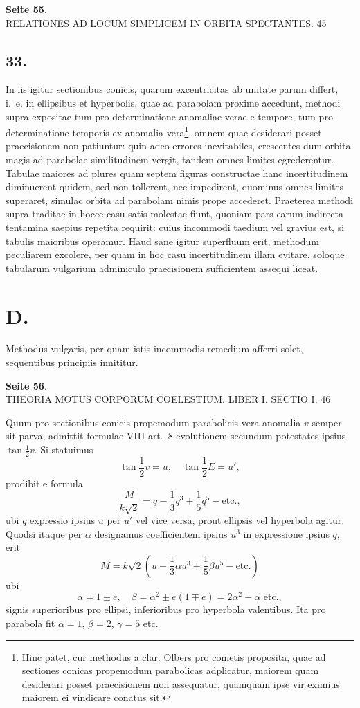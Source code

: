 \documentclass[12pt,a4paper]{article}
\begin{document}
\textbf{Seite 55}.\\
RELATIONES AD LOCUM SIMPLICEM IN ORBITA SPECTANTES. 45

\subsection*{33.}

In iis igitur sectionibus conicis, quarum excentricitas ab unitate parum differt, i.~e. in ellipsibus et hyperbolis, quae ad parabolam proxime accedunt, methodi supra expositae tum pro determinatione anomaliae verae e tempore, tum pro determinatione temporis ex anomalia vera\footnote{Hinc patet, cur methodus a clar. Olbers pro cometis proposita, quae ad sectiones conicas propemodum parabolicas adplicatur, maiorem quam desiderari posset praecisionem non assequatur, quamquam ipse vir eximius maiorem ei vindicare conatus sit.}, omnem quae desiderari posset praecisionem non patiuntur: quin adeo errores inevitabiles, crescentes dum orbita magis ad parabolae similitudinem vergit, tandem omnes limites egrederentur. Tabulae maiores ad plures quam septem figuras constructae hanc incertitudinem diminuerent quidem, sed non tollerent, nec impedirent, quominus omnes limites superaret, simulac orbita ad parabolam nimis prope accederet. Praeterea methodi supra traditae in hocce casu satis molestae fiunt, quoniam pars earum indirecta tentamina saepius repetita requirit: cuius incommodi taedium vel gravius est, si tabulis maioribus operamur. Haud sane igitur superfluum erit, methodum peculiarem excolere, per quam in hoc casu incertitudinem illam evitare, soloque tabularum vulgarium adminiculo praecisionem sufficientem assequi liceat.

\section*{D.}

Methodus vulgaris, per quam istis incommodis remedium afferri solet, sequentibus principiis innititur.

\textbf{Seite 56}.\\
THEORIA MOTUS CORPORUM COELESTIUM. LIBER I. SECTIO I. 46

Quum pro sectionibus conicis propemodum parabolicis vera anomalia $v$ semper sit parva, admittit formulae VIII art.~8 evolutionem secundum potestates ipsius $\tan \frac{1}{2}v$. Si statuimus
\[
\tan \frac{1}{2}v = u, \quad \tan \frac{1}{2}E = u',
\]
prodibit e formula
\[
\frac{M}{k \sqrt{2}} = q - \frac{1}{3}q^3 + \frac{1}{5}q^5 - \text{etc.},
\]
ubi $q$ expressio ipsius $u$ per $u'$ vel vice versa, prout ellipsis vel hyperbola agitur. Quodsi itaque per $\alpha$ designamus coefficientem ipsius $u^3$ in expressione ipsius $q$, erit
\[
M = k \sqrt{2} \left(u - \frac{1}{3}\alpha u^3 + \frac{1}{5}\beta u^5 - \text{etc.}\right)
\]
ubi
\[
\alpha = 1 \pm e, \quad \beta = \alpha^2 \pm e(1 \mp e) = 2\alpha^2 - \alpha \text{ etc.},
\]
signis superioribus pro ellipsi, inferioribus pro hyperbola valentibus. Ita pro parabola fit $\alpha = 1$, $\beta = 2$, $\gamma = 5$ etc.
\end{document}
